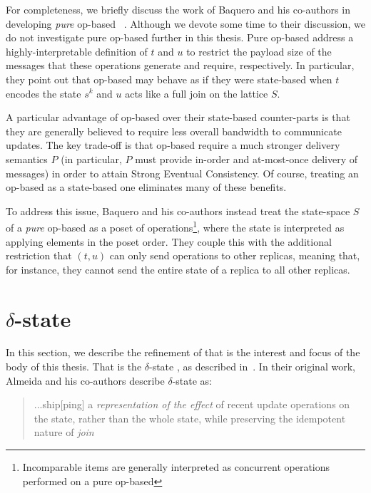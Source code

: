 For completeness, we briefly discuss the work of Baquero and his co-authors in
developing \emph{pure} op-based \CRDTs~\citep{baquero17}. Although we devote some
time to their discussion, we do not investigate pure op-based \CRDTs further in
this thesis. Pure op-based \CRDTs address a highly-interpretable definition of
$t$ and $u$ to restrict the payload size of the messages that these operations
generate and require, respectively. In particular, they point out that op-based
\CRDTs may behave as if they were state-based \CRDTs when $t$ encodes the state
$s^k$ and $u$ acts like a full join on the lattice $S$.

A particular advantage of op-based \CRDTs over their state-based counter-parts is
that they are generally believed to require less overall bandwidth to
communicate updates. The key trade-off is that op-based \CRDTs require a much
stronger delivery semantics $P$ (in particular, $P$ must provide in-order and
at-most-once delivery of messages) in order to attain Strong Eventual
Consistency. Of course, treating an op-based \CRDT as a state-based one
eliminates many of these benefits.

To address this issue, Baquero and his co-authors instead treat the state-space
$S$ of a \emph{pure} op-based \CRDT as a poset of
operations\footnote{Incomparable items are generally interpreted as concurrent
operations performed on a pure op-based \CRDT}, where the state is interpreted as
applying elements in the poset order. They couple this with the additional
restriction that $(t,u)$ can only send operations to other replicas, meaning
that, for instance, they cannot send the entire state of a replica to all other
replicas.

\section{$\delta$-state \CRDTs}
In this section, we describe the refinement of \CRDTs that is the interest and
focus of the body of this thesis. That is the $\delta$-state \CRDT, as described
in~\citep{almedia18}. In their original work, Almeida and his co-authors
describe $\delta$-state \CRDTs as:
\begin{quote}
...ship[ping] a \textit{representation of the effect} of recent update operations
on the state, rather than the whole state, while preserving the idempotent
nature of \textit{join}
\end{quote}

